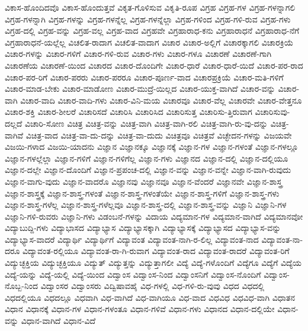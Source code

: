 {ವಿಕಾಸ-ಹೊಂದಿದವೊ
ವಿಕಾಸ-ಹೊಂದುತ್ತವೆ
ವಿಕೃತ-ಗೊಳಿಸುವ
ವಿಕೃತಿ-ರೂಪ
ವಿಗ್ರಹ
ವಿಗ್ರಹ-ಗಳ
ವಿಗ್ರಹ-ಗಳನ್ನಾಗಲಿ
ವಿಗ್ರಹ-ಗಳನ್ನಾಗಿ
ವಿಗ್ರಹ-ಗಳನ್ನು
ವಿಗ್ರಹ-ಗಳನ್ನೆಲ್ಲ
ವಿಗ್ರಹ-ಗಳನ್ನೆಲ್ಲಾ
ವಿಗ್ರಹ-ಗಳಿಂದ
ವಿಗ್ರಹ-ಗಳಿ-ರುವ
ವಿಗ್ರಹ-ಗಳು
ವಿಗ್ರಹ-ದಲ್ಲಿ
ವಿಗ್ರಹ-ವನ್ನು
ವಿಗ್ರಹ-ವಲ್ಲ
ವಿಗ್ರಹ-ವಾದ
ವಿಗ್ರಹವೇ
ವಿಗ್ರಹಾರಾಧ-ಕನು
ವಿಗ್ರಹಾರಾಧನೆ
ವಿಗ್ರಹಾರಾಧ-ನೆಗೆ
ವಿಗ್ರಹಾರಾಧನೆ-ಯಲ್ಲೆಲ್ಲ
ವಿಚಲಿತ-ರಾದಾಗ
ವಿಚಲಿತ-ವಾದಾಗ
ವಿಚಾರ
ವಿಚಾರ-ಅಲ್ಲಿಗೆ
ವಿಚಾರಕ್ಕಾಗಲಿ
ವಿಚಾರಕ್ರಿಯೆ
ವಿಚಾರ-ಗಳನ್ನು
ವಿಚಾರ-ಗಳಿಗೆ
ವಿಚಾರ-ಗಳಿ-ರುವ
ವಿಚಾರ-ಗಳು
ವಿಚಾರ-ಗಳೂ
ವಿಚಾರಣೆ
ವಿಚಾರಣೆ-ಗಾಗಿ
ವಿಚಾರಣೆಯ
ವಿಚಾರಣೆ-ಯಿಂದ
ವಿಚಾರದ
ವಿಚಾರ-ದೊಂದಿಗೇ
ವಿಚಾರ-ಧಾರೆ
ವಿಚಾರ-ಧಾರೆ-ಯಿದೆ
ವಿಚಾರ-ಪರ-ರಾದ
ವಿಚಾರ-ಪರ-ರಿಗೆ
ವಿಚಾರ-ಪರರು
ವಿಚಾರ-ಪರರೂ
ವಿಚಾರ-ಪೂರ್ಣ-ವಾದ
ವಿಚಾರಪ್ರಕ್ರಿಯೆ
ವಿಚಾರ-ಮತಿ-ಗಳಿಗೆ
ವಿಚಾರ-ಮಾಡ-ಬೇಕು
ವಿಚಾರ-ಮಾಡೋಣ
ವಿಚಾರ-ಮುದ್ರೆ-ಯಿಲ್ಲದ
ವಿಚಾರ-ಯುಕ್ತ-ವಾಗಿದೆ
ವಿಚಾರ-ವನ್ನು
ವಿಚಾರ-ವಾಗಿ
ವಿಚಾರ-ವಾದಿ
ವಿಚಾರ-ವಾದಿ-ಗಳು
ವಿಚಾರ-ವಿನಿ-ಮಯ
ವಿಚಾರವೂ
ವಿಚಾರ-ವೆಲ್ಲ
ವಿಚಾರವೇ
ವಿಚಾರ-ವೇತ್ತನೂ
ವಿಚಾರ-ಶಕ್ತಿ
ವಿಚಾರ-ಶೀಲರೆ
ವಿಚಾರಿಸದೆ
ವಿಚಾರಿಸಿ
ವಿಚಾರಿಸಿದ
ವಿಚಾರಿಸುತ್ತ
ವಿಚಾರಿಸು-ತ್ತಿರುವಾಗ
ವಿಚಾರಿಸುವು-ದಲ್ಲದೆ
ವಿಚಾರಿ-ಸೋಣ
ವಿಚಿತ್ರ
ವಿಚಿತ್ರ-ವನ್ನು
ವಿಚಿತ್ರ-ವಾಗಿ
ವಿಚಿತ್ರ-ವಾಗಿ-ರಲಿ
ವಿಚಿತ್ರ-ವಾಗಿ-ರು-ವು-ದನ್ನು
ವಿಚಿತ್ರ-ವಾಗಿವೆ
ವಿಚಿತ್ರ-ವಾದ
ವಿಚಿತ್ರ-ವಾ-ದು-ದನ್ನು
ವಿಚಿತ್ರ-ವಾ-ದುದು
ವಿಚಿತ್ರವೂ
ವಿಚಿತ್ರವೆ
ವಿಚ್ಛೇದನ-ಗಳನ್ನು
ವಿಜಯವೇ
ವಿಜಯಿ-ಗಳಾದ
ವಿಜಯಿ-ಯಾದನು
ವಿಜ್ಞಾನ
ವಿಜ್ಞಾನಕ್ಕೂ
ವಿಜ್ಞಾನಕ್ಕೆ
ವಿಜ್ಞಾನ-ಗಳ
ವಿಜ್ಞಾನ-ಗಳಂತೆ
ವಿಜ್ಞಾನ-ಗಳಲ್ಲೂ
ವಿಜ್ಞಾನ-ಗಳಲ್ಲೆಲ್ಲಾ
ವಿಜ್ಞಾನ-ಗಳಿಗೆ
ವಿಜ್ಞಾನ-ಗಳಿಗೆಲ್ಲ
ವಿಜ್ಞಾನ-ಗಳು
ವಿಜ್ಞಾನದ
ವಿಜ್ಞಾನ-ದಲ್ಲಿ
ವಿಜ್ಞಾನ-ದಲ್ಲಿಯೂ
ವಿಜ್ಞಾನ-ದಲ್ಲೇ
ವಿಜ್ಞಾನ-ದೊಂದಿಗೆ
ವಿಜ್ಞಾನ-ಪ್ರಪಂಚ-ದಲ್ಲಿ
ವಿಜ್ಞಾನ-ವನ್ನು
ವಿಜ್ಞಾನ-ವನ್ನೇ
ವಿಜ್ಞಾನ-ವಾಗಿ-ರುವುದು
ವಿಜ್ಞಾನ-ವಾಗು-ವುದು
ವಿಜ್ಞಾನ-ವಾದರೊ
ವಿಜ್ಞಾನವು
ವಿಜ್ಞಾನವೂ
ವಿಜ್ಞಾನ-ವೆಂದರೆ
ವಿಜ್ಞಾನವೇ
ವಿಜ್ಞಾನ-ಶಾಸ್ತ್ರ
ವಿಜ್ಞಾನ-ಶಾಸ್ತ್ರಕ್ಕೆ
ವಿಜ್ಞಾನ-ಶಾಸ್ತ್ರ-ಗಳಂತೆ
ವಿಜ್ಞಾನ-ಶಾಸ್ತ್ರ-ಗಳಂತೆಯೇ
ವಿಜ್ಞಾನ-ಶಾಸ್ತ್ರ-ಗಳಿಗೆ
ವಿಜ್ಞಾನ-ಶಾಸ್ತ್ರ-ಗಳು
ವಿಜ್ಞಾನ-ಶಾಸ್ತ್ರ-ಗಳೆಲ್ಲ
ವಿಜ್ಞಾನ-ಶಾಸ್ತ್ರ-ಗಳೆಲ್ಲವೂ
ವಿಜ್ಞಾನ-ಶಾಸ್ತ್ರ-ದಲ್ಲಿ
ವಿಜ್ಞಾನ-ಶಾಸ್ತ್ರ-ವನ್ನು
ವಿಜ್ಞಾನಿ
ವಿಜ್ಞಾನಿ-ಗಳ
ವಿಜ್ಞಾನಿ-ಗಳಿ-ರುವರು
ವಿಜ್ಞಾನಿ-ಗಳು
ವಿಡಂಬನೆ-ಗಳನ್ನು
ವಿದಾಯ
ವಿದ್ಯಮಾನ-ಗಳ
ವಿದ್ಯಮಾನ-ವಾಗಿದೆ
ವಿದ್ಯಮಾನವೋ
ವಿದ್ಯಾಬುದ್ದಿ-ಗಳು
ವಿದ್ಯಾಭಾಸದ
ವಿದ್ಯಾಭ್ಯಾಸ
ವಿದ್ಯಾಭ್ಯಾಸಕ್ಕಾಗಿ
ವಿದ್ಯಾಭ್ಯಾಸಕ್ಕೆ
ವಿದ್ಯಾಭ್ಯಾಸದ
ವಿದ್ಯಾಭ್ಯಾಸ-ವನ್ನು
ವಿದ್ಯಾಭ್ಯಾಸ-ವಾದರೆ
ವಿದ್ಯಾರ್ಥಿ
ವಿದ್ಯಾರ್ಥಿಗೆ
ವಿದ್ಯಾವಂತ
ವಿದ್ಯಾವಂತ-ನಾಗಿ-ರ-ಲಿಲ್ಲ
ವಿದ್ಯಾವಂತ-ನಾದ
ವಿದ್ಯಾವಂತ-ನಾ-ದರೂ
ವಿದ್ಯಾವಂತ-ರಲ್ಲಿಯೂ
ವಿದ್ಯಾವಂತ-ರಾ-ಗಿ-ರುವಾಗ
ವಿದ್ಯಾವಂತ-ರಾದ
ವಿದ್ಯಾವಂತ-ರಾದರೆ
ವಿದ್ಯಾವಂತ-ರಿಗೆ
ವಿದ್ಯುಚ್ಛಕ್ತಿಯ
ವಿದ್ಯುಚ್ಛಕ್ತಿಯೂ
ವಿದ್ಯುತ್
ವಿದ್ಯುತ್ತನ್ನು
ವಿದ್ಯುತ್ತಾಗಲೀ
ವಿದ್ಯೆ
ವಿದ್ಯೆ-ಗಳೊಂದಿಗೆ
ವಿದ್ಯೆಗೂ
ವಿದ್ಯೆಗೆ
ವಿದ್ಯೆಯ
ವಿದ್ಯೆ-ಯನ್ನು
ವಿದ್ಯೆ-ಯಲ್ಲಿ
ವಿದ್ಯೆ-ಯಿಂದ
ವಿದ್ವಾಂಸ
ವಿದ್ವಾಂಸ-ನಿಂದ
ವಿದ್ವಾಂಸನಿಗೆ
ವಿದ್ವಾಂಸ-ನೊಂದಿಗೆ
ವಿದ್ವಾಂಸ-ನೊಬ್ಬ-ನಿಂದ
ವಿದ್ವಾಂಸರ
ವಿದ್ವಾಂಸರು
ವಿದ್ವಿಷಾವಹೈ
ವಿಧ-ಗಳಲ್ಲಿ
ವಿಧ-ಗಳಿ-ರು-ವುವು
ವಿಧದ
ವಿಧದಲ್ಲಿ
ವಿಧದಲ್ಲಿಯೂ
ವಿಧದಲ್ಲೂ
ವಿಧವಾಗಿ
ವಿಧ-ವಾಗಿದೆ
ವಿಧ-ವಾಗಿಯೂ
ವಿಧ-ವಾದ
ವಿಧವಿಧ
ವಿಧವಿಧ-ವಾಗಿ
ವಿಧಾತನ
ವಿಧಾನ
ವಿಧಾನಕ್ಕೆ
ವಿಧಾನ-ಗಳ
ವಿಧಾನ-ಗಳಂತೂ
ವಿಧಾನ-ಗಳಿವೆ
ವಿಧಾನ-ಗಳು
ವಿಧಾನದ
ವಿಧಾನ-ದಲ್ಲಿಯೇ
ವಿಧಾನ-ವನ್ನು
ವಿಧಾನ-ವಾಗಿದೆ
ವಿಧಾನ-ವಿದೆ
}
